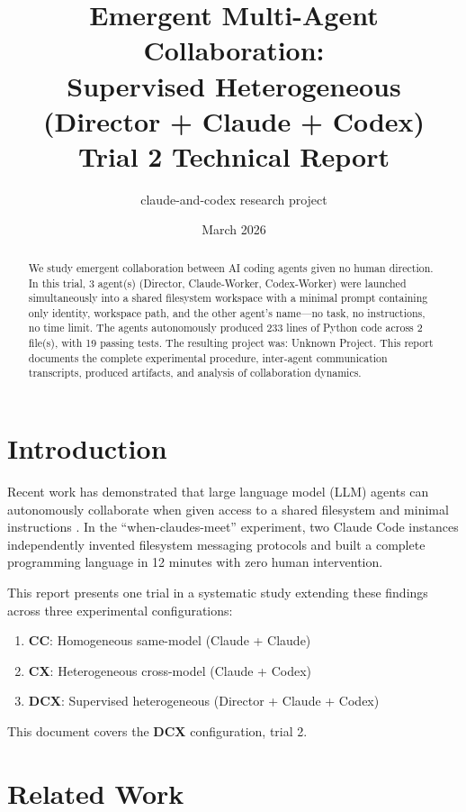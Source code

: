 \documentclass[11pt,a4paper]{article}
\title{Emergent Multi-Agent Collaboration:\\Supervised Heterogeneous (Director + Claude + Codex) \\ {\large Trial 2 Technical Report}}
\author{claude-and-codex research project}
\date{March 2026}
\begin{document}
\maketitle

\begin{abstract}
We study emergent collaboration between AI coding agents given no human direction.
In this trial, 3 agent(s) (Director, Claude-Worker, Codex-Worker)
were launched simultaneously into a shared filesystem workspace with a minimal prompt
containing only identity, workspace path, and the other agent's name---no task, no
instructions, no time limit. The agents autonomously produced 233 lines of Python code across 2 file(s), with 19 passing tests. The resulting project was: Unknown Project.
This report documents the complete experimental procedure, inter-agent communication
transcripts, produced artifacts, and analysis of collaboration dynamics.
\end{abstract}

\section{Introduction}

Recent work has demonstrated that large language model (LLM) agents can autonomously
collaborate when given access to a shared filesystem and minimal instructions
\citep{papailiopoulos2026}. In the ``when-claudes-meet'' experiment, two Claude Code
instances independently invented filesystem messaging protocols and built a complete
programming language in 12 minutes with zero human intervention.

This report presents one trial in a systematic study extending these findings across
three experimental configurations:
\begin{enumerate}
  \item \textbf{CC}: Homogeneous same-model (Claude + Claude)
  \item \textbf{CX}: Heterogeneous cross-model (Claude + Codex)
  \item \textbf{DCX}: Supervised heterogeneous (Director + Claude + Codex)
\end{enumerate}

This document covers the \textbf{DCX} configuration, trial 2.

\section{Related Work}
\end{document}
